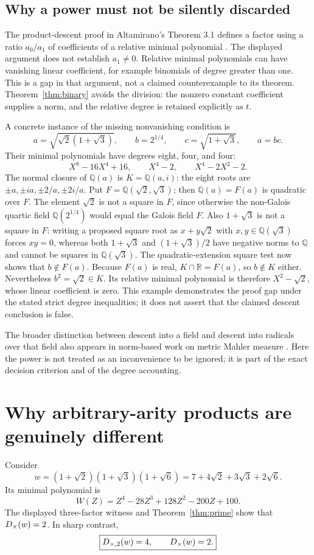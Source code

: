 \documentclass[11pt,a4paper]{article}
\theoremstyle{definition}\newtheorem{definition}[theorem]{Definition}
\theoremstyle{remark}\newtheorem{remark}[theorem]{Remark}
\newcommand{\Q}{\mathbb Q}\newcommand{\C}{\mathbb C}\newcommand{\Z}{\mathbb Z}
\begin{document}
\subsection{Why a power must not be silently discarded}
The product-descent proof in Altamirano's Theorem 3.1 defines a factor using a ratio $a_0/a_1$ of coefficients of a relative minimal polynomial \cite{altamirano}. The displayed argument does not establish $a_1\ne0$. Relative minimal polynomials can have vanishing linear coefficient, for example binomials of degree greater than one. This is a gap in that argument, not a claimed counterexample to its theorem. Theorem~\ref{thm:binary} avoids the division: the nonzero constant coefficient supplies a norm, and the relative degree is retained explicitly as $t$.

A concrete instance of the missing nonvanishing condition is
\[
 a=\sqrt{\sqrt2(1+\sqrt3)},\qquad b=2^{1/4},\qquad
 c=\sqrt{1+\sqrt3},\qquad a=bc.
\]
Their minimal polynomials have degrees eight, four, and four:
\[
 X^8-16X^4+16,\qquad X^4-2,\qquad X^4-2X^2-2.
\]
The normal closure of $\Q(a)$ is $K=\Q(a,i)$: the eight roots are
$\pm a,\pm ia,\pm2/a,\pm2i/a$. Put $F=\Q(\sqrt2,\sqrt3)$; then
$\Q(a)=F(a)$ is quadratic over $F$. The element $\sqrt2$ is not a square in $F$, since otherwise the non-Galois quartic field $\Q(2^{1/4})$ would equal the Galois field $F$. Also $1+\sqrt3$ is not a square in $F$: writing a proposed square root as $x+y\sqrt2$ with $x,y\in\Q(\sqrt3)$ forces $xy=0$, whereas both $1+\sqrt3$ and $(1+\sqrt3)/2$ have negative norms to $\Q$ and cannot be squares in $\Q(\sqrt3)$. The quadratic-extension square test now shows that $b\notin F(a)$. Because $F(a)$ is real, $K\cap\mathbb R=F(a)$, so $b\notin K$ either. Nevertheless $b^2=\sqrt2\in K$. Its relative minimal polynomial is therefore $X^2-\sqrt2$, whose linear coefficient is zero. This example demonstrates the proof gap under the stated strict degree inequalities; it does not assert that the claimed descent conclusion is false.

The broader distinction between descent into a field and descent into radicals over that field also appears in norm-based work on metric Mahler measure \cite{samuels}. Here the power is not treated as an inconvenience to be ignored; it is part of the exact decision criterion and of the degree accounting.

\section{Why arbitrary-arity products are genuinely different}
\label{sec:arity}
Consider
\begin{equation}
 w=(1+\sqrt2)(1+\sqrt3)(1+\sqrt6)
   =7+4\sqrt2+3\sqrt3+2\sqrt6.
 \label{eq:w}
\end{equation}
Its minimal polynomial is
\[
 W(Z)=Z^4-28Z^3+128Z^2-200Z+100.
\]
The displayed three-factor witness and Theorem~\ref{thm:prime} show that $D_{\times}(w)=2$. In sharp contrast,
\begin{equation}
 \boxed{D_{\times,2}(w)=4,\qquad D_{\times}(w)=2.}
 \label{eq:aritygap}
\end{equation}
\end{document}

